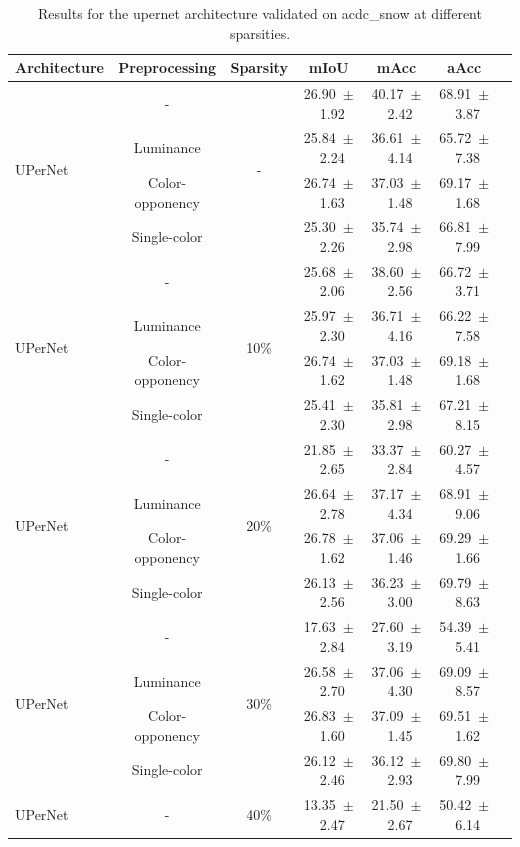 \begin{table}[h]
\centering
\caption{Results for the upernet architecture validated on acdc_snow at different sparsities.}
\begin{tabular}{@{}lccc ccc@{}}
\toprule
Architecture & Preprocessing & Sparsity & mIoU & mAcc & aAcc \\
\midrule

\multirow{4}{*}{UPerNet} & - & \multirow{4}{*}{-} & 26.90~$\pm$~1.92 & 40.17~$\pm$~2.42 & 68.91~$\pm$~3.87 \\
& Luminance & & 25.84~$\pm$~2.24 & 36.61~$\pm$~4.14 & 65.72~$\pm$~7.38 \\
& Color-opponency & & 26.74~$\pm$~1.63 & 37.03~$\pm$~1.48 & 69.17~$\pm$~1.68 \\
& Single-color & & 25.30~$\pm$~2.26 & 35.74~$\pm$~2.98 & 66.81~$\pm$~7.99 \\
\midrule
\multirow{4}{*}{UPerNet} & - & \multirow{4}{*}{10\%} & 25.68~$\pm$~2.06 & 38.60~$\pm$~2.56 & 66.72~$\pm$~3.71 \\
& Luminance & & 25.97~$\pm$~2.30 & 36.71~$\pm$~4.16 & 66.22~$\pm$~7.58 \\
& Color-opponency & & 26.74~$\pm$~1.62 & 37.03~$\pm$~1.48 & 69.18~$\pm$~1.68 \\
& Single-color & & 25.41~$\pm$~2.30 & 35.81~$\pm$~2.98 & 67.21~$\pm$~8.15 \\
\midrule
\multirow{4}{*}{UPerNet} & - & \multirow{4}{*}{20\%} & 21.85~$\pm$~2.65 & 33.37~$\pm$~2.84 & 60.27~$\pm$~4.57 \\
& Luminance & & 26.64~$\pm$~2.78 & 37.17~$\pm$~4.34 & 68.91~$\pm$~9.06 \\
& Color-opponency & & 26.78~$\pm$~1.62 & 37.06~$\pm$~1.46 & 69.29~$\pm$~1.66 \\
& Single-color & & 26.13~$\pm$~2.56 & 36.23~$\pm$~3.00 & 69.79~$\pm$~8.63 \\
\midrule
\multirow{4}{*}{UPerNet} & - & \multirow{4}{*}{30\%} & 17.63~$\pm$~2.84 & 27.60~$\pm$~3.19 & 54.39~$\pm$~5.41 \\
& Luminance & & 26.58~$\pm$~2.70 & 37.06~$\pm$~4.30 & 69.09~$\pm$~8.57 \\
& Color-opponency & & 26.83~$\pm$~1.60 & 37.09~$\pm$~1.45 & 69.51~$\pm$~1.62 \\
& Single-color & & 26.12~$\pm$~2.46 & 36.12~$\pm$~2.93 & 69.80~$\pm$~7.99 \\
\midrule
\multirow{4}{*}{UPerNet} & - & \multirow{4}{*}{40\%} & 13.35~$\pm$~2.47 & 21.50~$\pm$~2.67 & 50.42~$\pm$~6.14 \\

\end{tabular}
\end{table}
